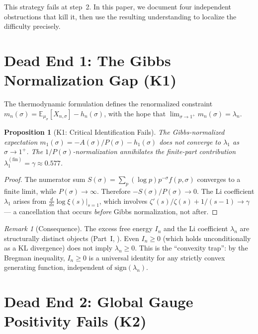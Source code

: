 \documentclass[12pt,a4paper]{article}
\newtheorem{proposition}[theorem]{Proposition}
\theoremstyle{definition}
\theoremstyle{remark}
\newtheorem{remark}[theorem]{Remark}
\newcommand{\EE}{\mathbb{E}}
\newcommand{\muG}{\mu_\sigma}
\begin{document}
This strategy fails at step~2. In this paper, we document four independent obstructions that kill it, then use the resulting understanding to localize the difficulty precisely.


\section{Dead End 1: The Gibbs Normalization Gap (K1)}
\label{sec:K1}

The thermodynamic formulation defines the renormalized constraint $m_n(\sigma) = \EE_{\muG}[X_{n,\sigma}] - h_n(\sigma)$, with the hope that $\lim_{\sigma \to 1^+} m_n(\sigma) = \lambda_n$.

\begin{proposition}[K1: Critical Identification Fails]
\label{prop:K1}
The Gibbs-normalized expectation $m_1(\sigma) = -A(\sigma)/P(\sigma) - h_1(\sigma)$ does \emph{not} converge to $\lambda_1$ as $\sigma \to 1^+$. The $1/P(\sigma)$-normalization annihilates the finite-part contribution $\lambda_1^{(\mathrm{fin})} = \gamma \approx 0.577$.
\end{proposition}

\begin{proof}
The numerator sum $S(\sigma) = \sum_p (\log p)p^{-\sigma}f(p,\sigma)$ converges to a finite limit, while $P(\sigma) \to \infty$. Therefore $-S(\sigma)/P(\sigma) \to 0$. The Li coefficient $\lambda_1$ arises from $\frac{d}{ds}\log\xi(s)|_{s=1}$, which involves $\zeta'(s)/\zeta(s) + 1/(s-1) \to \gamma$ --- a cancellation that occurs \emph{before} Gibbs normalization, not after.
\end{proof}

\begin{remark}[Consequence]
The excess free energy $I_n$ and the Li coefficient $\lambda_n$ are structurally distinct objects (Part~I, ). Even $I_n \geq 0$ (which holds unconditionally as a KL divergence) does not imply $\lambda_n \geq 0$. This is the ``convexity trap'': by the Bregman inequality, $I_n \geq 0$ is a universal identity for any strictly convex generating function, independent of $\mathrm{sign}(\lambda_n)$.
\end{remark}


\section{Dead End 2: Global Gauge Positivity Fails (K2)}
\label{sec:K2}
\end{document}
